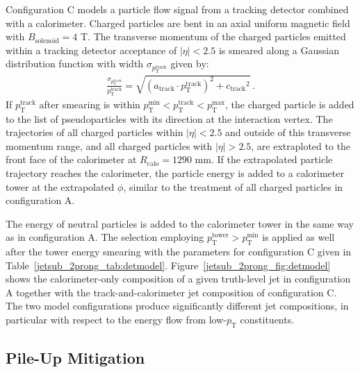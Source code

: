 \documentclass[11pt]{cernrep}
\begin{document}
Configuration C models a particle flow signal from a tracking detector combined with a calorimeter. 
Charged particles are bent in an axial uniform magnetic field with $B_{\text{solenoid}} = 4$ T.
The transverse momentum of the charged particles emitted within a tracking detector acceptance of $|\eta|<2.5$
is smeared along a Gaussian distribution function with width $\sigma_{\ensuremath{p_{\text{T}}^{\text{track}}}}$ given by:
\begin{align}
  \frac{\sigma_{\ensuremath{p_{\text{T}}^{\text{track}}}}}{\ensuremath{p_{\text{T}}^{\text{track}}}} = \sqrt{(\ensuremath{a_{\text{track}}}\cdot\ensuremath{p_{\text{T}}^{\text{track}}})^{2} + \ensuremath{c_{\text{track}}}^{2}}\,.
  \label{jetsub_2prong_eq:trkreso}
\end{align} 
If \ensuremath{p_{\text{T}}^{\text{track}}}{} after smearing is within $\ensuremath{p_{\text{T}}^{\text{min}}} < \ensuremath{p_{\text{T}}^{\text{track}}} < \ensuremath{p_{\text{T}}^{\text{max}}}$, the charged particle is added to the list of pseudoparticles with its direction at the interaction vertex. 
The trajectories of all charged particles within $|\eta| < 2.5$ and outside of this transverse momentum range, 
and all charged particles with $|\eta| > 2.5$, are extraploted to the front face of the calorimeter at $R_{\text{calo}} = 1290$ mm.
If the extrapolated particle trajectory reaches the calorimeter, the particle energy is added to a calorimeter tower at the extrapolated $\phi$, similar to the treatment of all charged particles in configuration A.

The energy of neutral particles is added to the calorimeter tower in the same way as in configuration A. 
The selection employing $\ensuremath{p_{\text{T}}^{\text{tower}}} > \ensuremath{p_{\text{T}}^{\text{min}}}$ is applied as well after the tower energy smearing with the parameters for configuration C given in Table~\ref{jetsub_2prong_tab:detmodel}. 
Figure~\ref{jetsub_2prong_fig:detmodel} shows the calorimeter-only composition of a given truth-level jet in configuration A together with the track-and-calorimeter jet composition of configuration C.
The two model configurations produce significantly different jet compositions, in particular with respect to the energy flow from low-\ensuremath{p_{\text{T}}}{} constituents.










\subsection{Pile-Up Mitigation}\label{jetsub_2prong_sec:pu_tech}
\end{document}
